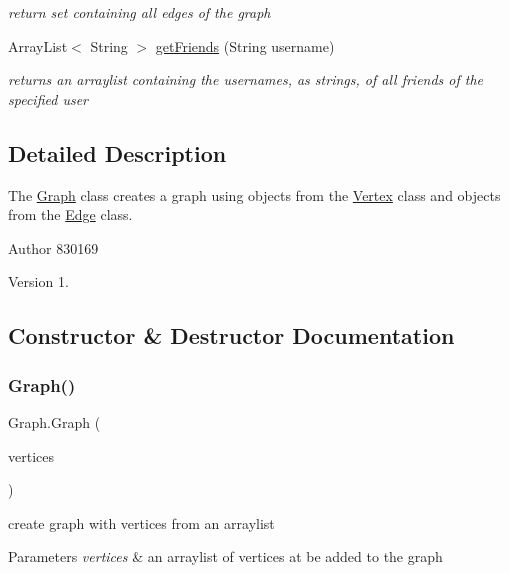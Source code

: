 \begin{DoxyCompactItemize}
\begin{DoxyCompactList}\small\item\em return set containing all edges of the graph \end{DoxyCompactList}\item 
Array\+List$<$ String $>$ \hyperlink{class_graph_a71fd5502d7ef1fb08f9ef49a3b507cb1}{get\+Friends} (String username)
\begin{DoxyCompactList}\small\item\em returns an arraylist containing the usernames, as strings, of all friends of the specified user \end{DoxyCompactList}\end{DoxyCompactItemize}


\subsection{Detailed Description}
The \hyperlink{class_graph}{Graph} class creates a graph using objects from the \hyperlink{class_vertex}{Vertex} class and objects from the \hyperlink{class_edge}{Edge} class. 

\begin{DoxyAuthor}{Author}
830169 
\end{DoxyAuthor}
\begin{DoxyVersion}{Version}
1. 
\end{DoxyVersion}


\subsection{Constructor \& Destructor Documentation}
\mbox{\label{class_graph_ac1c989504f624086332f46af57861d3a}} 
\subsubsection{\texorpdfstring{Graph()}{Graph()}}
{\footnotesize\ttfamily Graph.\+Graph (\begin{DoxyParamCaption}\item[{Array\+List$<$ \hyperlink{class_vertex}{Vertex} $>$}]{vertices }\end{DoxyParamCaption})}



create graph with vertices from an arraylist 


\begin{DoxyParams}{Parameters}
{\em vertices} & an arraylist of vertices at be added to the graph \\
\hline
\end{DoxyParams}


